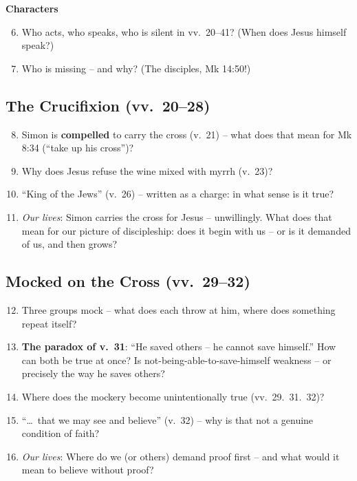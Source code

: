 \documentclass[12pt,a4paper]{article}
\begin{document}
\textbf{Characters}
\begin{enumerate}\setcounter{enumi}{5}
  \item Who acts, who speaks, who is silent in vv.~20--41? (When does Jesus himself speak?)
  \item Who is missing -- and why? (The disciples, Mk 14:50!)
\end{enumerate}

\subsection*{The Crucifixion (vv.~20--28)}
\begin{enumerate}\setcounter{enumi}{7}
  \item Simon is \textbf{compelled} to carry the cross (v.~21) -- what does that mean for Mk 8:34 (``take up his cross'')?
  \item Why does Jesus refuse the wine mixed with myrrh (v.~23)?
  \item ``King of the Jews'' (v.~26) -- written as a charge: in what sense is it true?
  \item \emph{Our lives}: Simon carries the cross for Jesus -- unwillingly. What does that mean for our picture of discipleship: does it begin with us -- or is it demanded of us, and then grows?
\end{enumerate}

\subsection*{Mocked on the Cross (vv.~29--32)}
\begin{enumerate}\setcounter{enumi}{11}
  \item Three groups mock -- what does each throw at him, where does something repeat itself?
  \item \textbf{The paradox of v.~31}: ``He saved others -- he cannot save himself.'' How can both be true at once? Is not-being-able-to-save-himself weakness -- or precisely the way he saves others?
  \item Where does the mockery become unintentionally true (vv.~29.~31.~32)?
  \item ``\ldots\ that we may see and believe'' (v.~32) -- why is that not a genuine condition of faith?
  \item \emph{Our lives}: Where do we (or others) demand proof first -- and what would it mean to believe without proof?
\end{enumerate}
\end{document}
